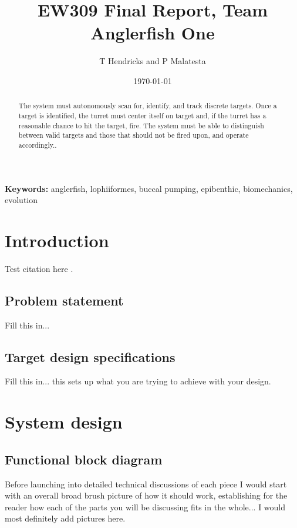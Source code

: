 \documentclass{article}
\title{EW309 Final Report, Team Anglerfish One}
\author{T Hendricks and P Malatesta}
\date{\today}
\begin{document}
\maketitle

\begin{abstract}
The system must autonomously scan for, identify, and track discrete targets. Once a target is identified, the turret must center itself on target and, if the turret has a reasonable chance to hit the target, fire. The system must be able to distinguish between valid targets and those that should not be fired upon, and operate accordingly..
\end{abstract}

{\scriptsize \textbf{Keywords:} anglerfish, lophiiformes, buccal pumping, epibenthic, biomechanics, evolution}

\section{Introduction}
Test citation here \cite{buck2020go}.
\subsection{Problem statement}
Fill this in... 


\subsection{Target design specifications}
Fill this in... this sets up what you are trying to achieve with your design. 


\section{System design}
\subsection{Functional block diagram}
Before launching into detailed technical discussions of each piece I would start with an overall broad brush picture of how it should work, establishing for the reader how each of the parts you will be discussing fits in the whole... I would most definitely add pictures here. 
\end{document}
